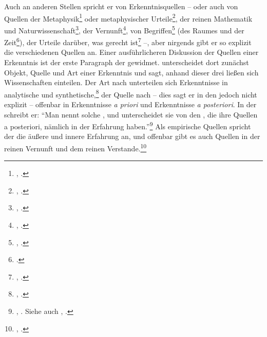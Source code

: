 Auch an anderen Stellen spricht er von Erkenntnisquellen -- oder auch
von Quellen der Metaphysik\footnote{\cite[Vgl.][\S~2]{Kant:ProlegomenazueinerjedenkuenftigenMetaphysikdiealsWissenschaftwirdauftretenkoennen1977},
\cite[][IV: 265.6--266.8]{Kant:GesammelteWerke1900ff.}.} oder metaphysischer
Urteile\footnote{\cite[Vgl.][\S~3]{Kant:ProlegomenazueinerjedenkuenftigenMetaphysikdiealsWissenschaftwirdauftretenkoennen1977},
\cite[][IV: 270.9]{Kant:GesammelteWerke1900ff.}.}, der reinen Mathematik und
Naturwissenschaft\footnote{\cite[Vgl.][\S~5]{Kant:ProlegomenazueinerjedenkuenftigenMetaphysikdiealsWissenschaftwirdauftretenkoennen1977},
\cite[][IV: 280.10]{Kant:GesammelteWerke1900ff.}.}, der
Vernunft\footnote{\cite[Vgl.][A
3]{Kant:ProlegomenazueinerjedenkuenftigenMetaphysikdiealsWissenschaftwirdauftretenkoennen1977},
\cite[][IV: 255.8]{Kant:GesammelteWerke1900ff.}.}, von
Begriffen\footnote{\cite[Vgl.][A
62]{Kant:ProlegomenazueinerjedenkuenftigenMetaphysikdiealsWissenschaftwirdauftretenkoennen1977},
\cite[][IV: 288.22]{Kant:GesammelteWerke1900ff.}.} (des Raumes und der
Zeit\footnote{\cite[Vgl.][B 119\,f.,]{Kant:KritikderreinenVernunft2003}
\cite[][III: 101.13--15]{Kant:GesammelteWerke1900ff.}.}), der Urteile darüber,
was gerecht ist\footnote{\cite[Vgl.][BA 32]{Kant:DieMetaphysikderSitten1977Rechtslehre},
\cite[][VI: 229.18--230.6]{Kant:GesammelteWerke1900ff.}.} --, aber nirgends gibt
er so explizit die verschiedenen Quellen an. Einer ausführlicheren Diskussion der
Quellen einer Erkenntnis ist der erste Paragraph der 
gewidmet.  unterscheidet dort zunächst Objekt, Quelle und
Art einer Erkenntnis und sagt, anhand dieser drei ließen sich Wissenschaften
einteilen. Der Art nach unterteilen sich Erkenntnisse in analytische und
synthetische,\footnote{\cite[Vgl.][\S~2]{Kant:ProlegomenazueinerjedenkuenftigenMetaphysikdiealsWissenschaftwirdauftretenkoennen1977},
\cite[][IV: ]{Kant:GesammelteWerke1900ff.}.} der Quelle nach -- dies sagt er in
den  jedoch nicht explizit -- offenbar in Erkenntnisse
\emph{a priori} und Erkenntnisse \emph{a posteriori}. In der  schreibt er: \enquote{Man nennt solche ,
und unterscheidet sie von den , die ihre Quellen a
posteriori, nämlich in der Erfahrung haben.}\footnote{\cite[][B
2]{Kant:KritikderreinenVernunft2003}, \cite[][III:
28.4--6]{Kant:GesammelteWerke1900ff.}. Siehe auch
\cite[][B 35]{Kant:KritikderreinenVernunft2003},
\cite[][III: 50.35, 51.22]{Kant:GesammelteWerke1900ff.}.} Als empirische
Quellen spricht der die äußere und innere Erfahrung an, und offenbar gibt es auch Quellen in der reinen Vernunft und dem reinen Verstande.\footnote{\cite[Vgl.][\S~1]{Kant:KritikderreinenVernunft2003},
\cite[][IV: 265.6--266.8]{Kant:GesammelteWerke1900ff.}.} 
